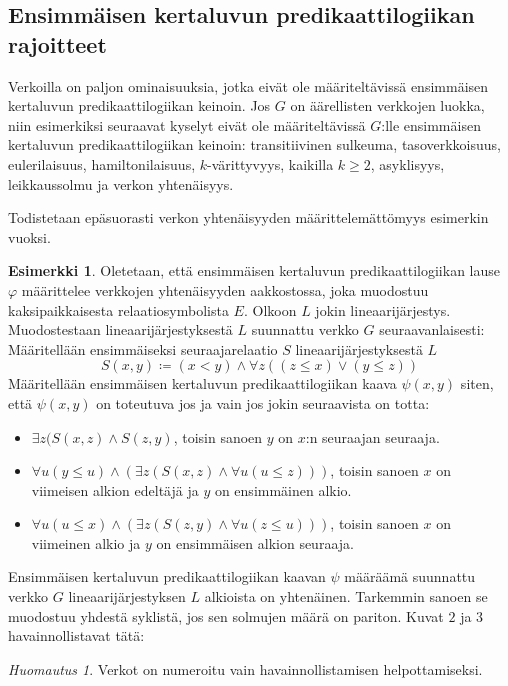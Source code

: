 \documentclass[finnish]{tktltiki2}
\theoremstyle{definition}
\newtheorem{esim}[lau]{Esimerkki}
\theoremstyle{remark}
\newtheorem*{huom}{Huomautus}
\begin{document}
\subsection{Ensimmäisen kertaluvun predikaattilogiikan rajoitteet}
Verkoilla on paljon ominaisuuksia, jotka eivät ole määriteltävissä ensimmäisen kertaluvun predikaattilogiikan keinoin. Jos $G$ on äärellisten verkkojen luokka, niin esimerkiksi seuraavat kyselyt eivät ole määriteltävissä $G$:lle ensimmäisen kertaluvun predikaattilogiikan keinoin: transitiivinen sulkeuma, tasoverkkoisuus, eulerilaisuus, hamiltonilaisuus, $k$-värittyvyys, kaikilla $ k \geq 2$, asyklisyys, leikkaussolmu ja verkon yhtenäisyys.

Todistetaan epäsuorasti verkon yhtenäisyyden määrittelemättömyys esimerkin vuoksi.
\begin{esim}
Oletetaan, että ensimmäisen kertaluvun predikaattilogiikan lause $\varphi$ määrittelee verkkojen yhtenäisyyden aakkostossa, joka muodostuu kaksipaikkaisesta relaatiosymbolista $E$. Olkoon $L$ jokin lineaarijärjestys. Muodostestaan lineaarijärjestyksestä $L$ suunnattu verkko $G$ seuraavanlaisesti: Määritellään ensimmäiseksi seuraajarelaatio $S$ lineaarijärjestyksestä $L$ \[S(x, y) \coloneqq (x < y) \land \forall z ((z \leq x) \lor (y \leq z))\]
Määritellään ensimmäisen kertaluvun predikaattilogiikan kaava $\psi(x, y)$ siten, että $\psi(x, y)$ on toteutuva jos ja vain jos jokin seuraavista on totta:
\begin{itemize}
\item $\exists z (S(x, z) \land S(z, y)$, toisin sanoen $y$ on $x$:n seuraajan seuraaja.
\item $\forall u (y \leq u) \land (\exists z(S(x, z) \land \forall u(u \leq z)))$, toisin sanoen $x$ on viimeisen alkion edeltäjä ja $y$ on ensimmäinen alkio.
\item $\forall u (u \leq x) \land (\exists z(S(z, y) \land \forall u(z \leq u)))$, toisin sanoen $x$ on viimeinen alkio ja $y$ on ensimmäisen alkion seuraaja.
\end{itemize}
Ensimmäisen kertaluvun predikaattilogiikan kaavan $\psi$ määräämä suunnattu verkko $G$ lineaarijärjestyksen $L$ alkioista on yhtenäinen. Tarkemmin sanoen se muodostuu yhdestä syklistä, jos sen solmujen määrä on pariton. Kuvat $2$ ja $3$ havainnollistavat tätä:

\begin{huom}
Verkot on numeroitu vain havainnollistamisen helpottamiseksi.
\end{huom}


\end{esim}
\end{document}

